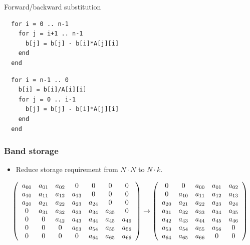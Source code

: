 \documentclass{beamer}
\begin{document}
 \begin{frame}[fragile]{Forward/backward substitution}
\begin{lstlisting}
  for i = 0 .. n-1
    for j = i+1 .. n-1
      b[j] = b[j] - b[i]*A[j][i]
    end
  end
\end{lstlisting}

\begin{lstlisting}
  for i = n-1 .. 0
    b[i] = b[i]/A[i][i]
    for j = 0 .. i-1
      b[j] = b[j] - b[i]*A[j][i]
    end
  end
\end{lstlisting}

\end{frame}
\begin{frame}
\frametitle{Band storage}
\centering

\begin{itemize}
\item{Reduce storage requirement from $N \cdot N$ to $N \cdot k$.}
\end{itemize}

\vspace{1cm}
{\normalsize
$$
\left(
\begin{array}{c c c c c c c}
a_{00} & a_{01} & a_{02} & 0 & 0 & 0 & 0\\
a_{10} & a_{11} & a_{12} & a_{13} & 0 & 0 & 0\\
a_{20} & a_{21} & a_{22} & a_{23} & a_{24} & 0 & 0\\
     0 & a_{31} & a_{32} & a_{33} & a_{34} & a_{35} & 0\\
     0 &      0 & a_{42} & a_{43} & a_{44} & a_{45} & a_{46}\\
     0 &      0 &      0 & a_{53} & a_{54} & a_{55} & a_{56}\\
     0 &      0 &      0 &      0 & a_{64} & a_{65} & a_{66}\\
\end{array}
\right)
\rightarrow
\left(
\begin{array}{c c c c c}
     0 &      0 & a_{00} & a_{01} & a_{02}\\
     0 & a_{10} & a_{11} & a_{12} & a_{13}\\
a_{20} & a_{21} & a_{22} & a_{23} & a_{24}\\
a_{31} & a_{32} & a_{33} & a_{34} & a_{35}\\
a_{42} & a_{43} & a_{44} & a_{45} & a_{46}\\
a_{53} & a_{54} & a_{55} & a_{56} & 0     \\
a_{64} & a_{65} & a_{66} & 0      & 0
\end{array}
\right)
$$
}



\end{frame}
\end{document}
